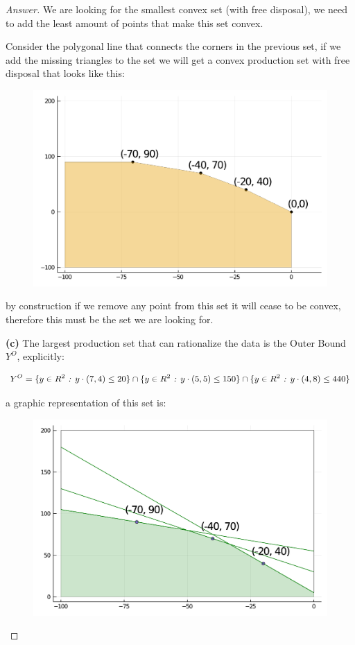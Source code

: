 \documentclass{article}
\theoremstyle{definition}
\newcommand{\settf}{\text{ \emph{:} }}
\begin{document}
\begin{proof}[Answer]
We are looking for the smallest convex set (with free disposal), we need to add the least amount of points that make this set convex.

Consider the polygonal line that connects the corners in the previous set, if we add the missing triangles to the set we will get a convex production set with free disposal that looks like this:
\newpage
\begin{figure}[h]
    \centering
    \includegraphics[scale=0.5]{Problem Set 1 Files/y_smallconvex_4.pdf}
    \label{fig:my_label}
\end{figure}

by construction if we remove any point from this set it will cease to be convex, therefore this must be the set we are looking for.

\textbf{(c)} The largest production set that can rationalize the data is the Outer Bound $Y^O$, explicitly:

$$Y^O = \{y\in R^{2} \settf y\cdot (7,4) \leq 20\} \cap \{y\in R^{2} \settf y\cdot (5,5) \leq 150\} \cap \{y\in R^{2} \settf y\cdot (4,8) \leq 440\}$$

a graphic representation of this set is:
\begin{figure}[h]
    \centering
    \includegraphics[scale=0.5]{Problem Set 1 Files/y_o_2_set.pdf}
    \label{fig:my_label}
\end{figure}


\end{proof}
\end{document}
